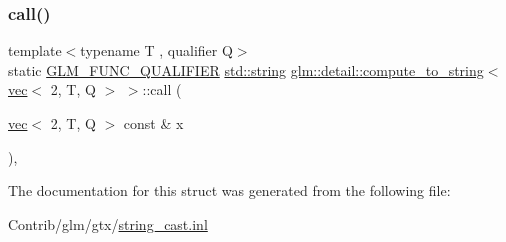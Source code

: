 \subsubsection{\texorpdfstring{call()}{call()}}
{\footnotesize\ttfamily template$<$typename T , qualifier Q$>$ \\
static \mbox{\hyperlink{setup_8hpp_a33fdea6f91c5f834105f7415e2a64407}{G\+L\+M\+\_\+\+F\+U\+N\+C\+\_\+\+Q\+U\+A\+L\+I\+F\+I\+ER}} \mbox{\hyperlink{_s_d_l__opengl__glext_8h_ae84541b4f3d8e1ea24ec0f466a8c568b}{std\+::string}} \mbox{\hyperlink{structglm_1_1detail_1_1compute__to__string}{glm\+::detail\+::compute\+\_\+to\+\_\+string}}$<$ \mbox{\hyperlink{structglm_1_1vec}{vec}}$<$ 2, T, Q $>$ $>$\+::call (\begin{DoxyParamCaption}\item[{\mbox{\hyperlink{structglm_1_1vec}{vec}}$<$ 2, T, Q $>$ const \&}]{x }\end{DoxyParamCaption})\hspace{0.3cm}{\ttfamily [inline]}, {\ttfamily [static]}}



The documentation for this struct was generated from the following file\+:\begin{DoxyCompactItemize}
\item 
Contrib/glm/gtx/\mbox{\hyperlink{string__cast_8inl}{string\+\_\+cast.\+inl}}\end{DoxyCompactItemize}
